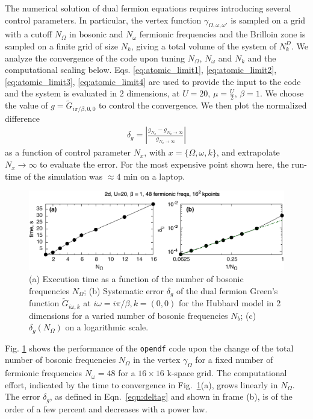 \documentclass[3p,times,procedia]{elsarticle}
\begin{document}
The numerical solution of dual fermion equations requires introducing several control parameters. In particular,
the vertex function $\gamma_{\Omega,\omega,\omega'}$ is sampled on a grid with a cutoff $N_\Omega$ in bosonic and $N_{\omega}$ fermionic frequencies and the Brilloin zone is sampled on a finite grid of size $N_k$, giving a total volume of the system of $N_k^D$. We analyze the convergence of the code upon tuning $N_{\Omega}$, $N_{\omega}$ and $N_k$ and the computational scaling below. Eqs. \ref{eq:atomic_limit1}, \ref{eq:atomic_limit2}, \ref{eq:atomic_limit3}, \ref{eq:atomic_limit4} are used to provide the input to the code and the system is evaluated in $2$ dimensions, at $U=20$, $\mu = \frac{U}{2}$, $\beta = 1$. We choose the value of $g= \tilde G_{i\pi / \beta, 0, 0}$ to control the convergence. We then plot the normalized difference 
\begin{align}\label{eqn:deltag}
\delta_{g} = \left|\frac{g_{N_x} - g_{N_x \to \infty}}{g_{N_x \to \infty}}\right|
\end{align}
 as a function of control parameter $N_x$, with $x = \{ \Omega, \omega, k \}$, and extrapolate  $N_x \to \infty$ 
to evaluate the error. For the most expensive point shown here, the run-time of the simulation was $\approx 4$ min on a laptop.

\begin{figure}[ht]
\includegraphics[width=1.0\columnwidth]{time_bfreqs.pdf}
\caption{(a) Execution time as a function of the number of bosonic frequencies $N_{\Omega}$; (b) Systematic error $\delta_g$ of the dual fermion Green's function $\tilde G_{i\omega, k}$ at $i\omega = i\pi / \beta, k = (0,0)$ for the Hubbard model in 2 dimensions for a varied number of bosonic frequencies $N_b$; (c) $\delta_g(N_{\Omega})$ on a logarithmic scale. }
\label{fig:benchmark_b}
\end{figure}

Fig. \ref{fig:benchmark_b} shows the performance of the \texttt{opendf} code upon the change of the total number of bosonic frequencies $N_{\Omega}$ in the vertex $\gamma_{\Omega}$ for a fixed number of fermionic frequencies $N_{\omega}=48$ for a $16 \times 16$ k-space grid. The computational effort, indicated by the time to convergence in Fig.~\ref{fig:benchmark_b}(a), grows linearly in $N_{\Omega}$. The error $\delta_g$, as defined in Eqn.~\ref{eqn:deltag} and shown in frame (b), is of the order of a few percent and decreases with a power law.
\end{document}
